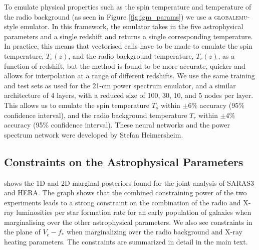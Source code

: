 To emulate physical properties such as the spin temperature and temperature of the radio background (as seen in Figure \ref{fig:igm_params}) we use a \textsc{globalemu}-style emulator. In this framework, the emulator takes in the five astrophysical parameters and a single redshift and returns a single corresponding temperature. In practice, this means that vectorised calls have to be made to emulate the spin temperature, $T_s(z)$, and the radio background temperature, $T_r(z)$, as a function of redshift, but the method is found to be more accurate, quicker and allows for interpolation at a range of different redshifts. We use the same training and test sets as used for the 21-cm power spectrum emulator, and a similar architecture of 4 layers, with a reduced size of 100, 30, 10, and 5 nodes per layer. This allows us to emulate the spin temperature $T_s$ within $\pm 6\%$ accuracy (95\% confidence interval), and the radio background temperature $T_{r}$ within $\pm 4\%$ accuracy (95\% confidence interval). These neural networks and the power spectrum network were developed by Stefan Heimersheim.

\subsection{Constraints on the Astrophysical Parameters}

 shows the 1D and 2D marginal posteriors found for the joint analysis of SARAS3 and HERA. The graph shows that the combined constraining power of the two experiments leads to a strong constraint on the combination of the radio and X-ray luminosities per star formation rate for an early population of galaxies when marginalising over the other astrophysical parameters. We also see constraints in the plane of $V_c - f_*$ when marginalizing over the radio background and X-ray heating parameters. The constraints are summarized in detail in the main text.

